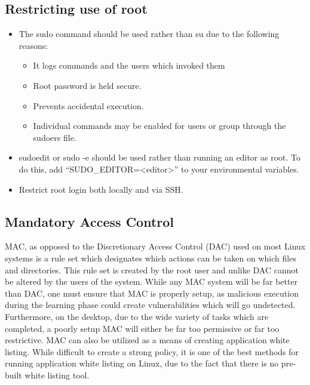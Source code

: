 \documentclass[a4paper,11pt]{report}
\begin{document}
			\subsection{Restricting use of root}
				\begin{itemize}
					\item The sudo command should be used rather than su due to the following reasons:
						\begin{itemize}
							\item It logs commands and the users which invoked them
							\item Root password is held secure. 
							\item Prevents accidental execution. 
							\item Individual commands may be enabled for users or group through the sudoers file. 
						\end{itemize}
					\item sudoedit or sudo -e should be used rather than running an editor as root. 
						To do this, add ``SUDO\_EDITOR=<editor>'' to your environmental variables.
					\item Restrict root login both locally and via SSH. 
				\end{itemize}
			\subsection{Mandatory Access Control}
				MAC, as opposed to the Discretionary Access Control (DAC) used on most Linux systems is a rule set which designates which actions can be taken on which files and directories. 
				This rule set is created by the root user and unlike DAC cannot be altered by the users of the system. 
				While any MAC system will be far better than DAC, one must ensure that MAC is properly setup, as malicious execution during the learning phase could create vulnerabilities which will go undetected. 
				Furthermore, on the desktop, due to the wide variety of tasks which are completed, a poorly setup MAC will either be far too permissive or far too restrictive. 
				MAC can also be utilized as a means of creating application white listing.
				While difficult to create a strong policy, it is one of the best methods for running application white listing on Linux, 
				due to the fact that there is no pre-built white listing tool. 
\end{document}
